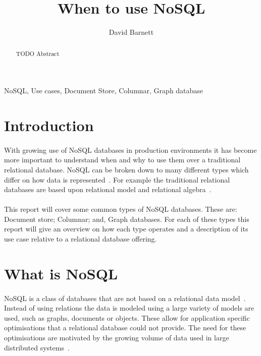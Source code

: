 \documentclass{CRPITStyle}
\renewcommand{\cite}{\citep}
\begin{document}
\title{When to use NoSQL}
\author{David Barnett}

\maketitle

\begin{abstract}
    TODO Abstract
\end{abstract}

\vspace{.1in}

 NoSQL, Use cases, Document Store, Columnar, Graph database

\section{Introduction}

\paragraph{}
With growing use of NoSQL databases in production environments it has become more
important to understand when and why to use them over a traditional
relational database.
NoSQL can be broken down to many different types which differ on how
data is represented~\cite{type_nosql}.
For example the traditional relational databases are based upon relational
model and relational algebra~\cite{relational_db}.

\paragraph{}
This report will cover some common types of NoSQL databases.
These are: Document store; Columnar; and, Graph databases.
For each of these types this report will give an overview on how each type
operates and a description of its use case relative to a relational database
offering.

\section{What is NoSQL}

\paragraph{}
NoSQL is a class of databases that are not based on
a relational data model~\cite{nosql_db,nosql_survey}.
Instead of using relations the data is modeled using a large
variety of models are used, such as graphs, documents or objects.
These allow for application specific optimisations that
a relational database could not provide.
The need for these optimisations are motivated by the growing
volume of data used in large distributed systems~\cite{nosql_db,nosql_survey}.
\end{document}
